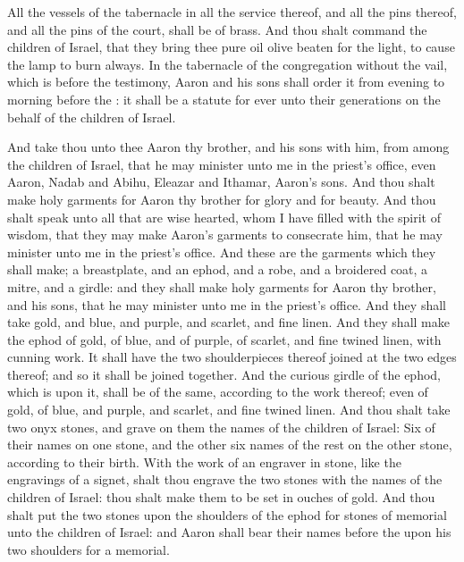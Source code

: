 \begin{biblechapter}
\verse All the vessels of the tabernacle in all the service thereof, and all the pins thereof, and all the pins of the court, shall be of brass.
 And thou shalt command the children of Israel, that they bring thee pure oil olive beaten for the light, to cause the lamp to burn always.
\verse In the tabernacle of the congregation without the vail, which is before the testimony, Aaron and his sons shall order it from evening to morning before the \LORD: it shall be a statute for ever unto their generations on the behalf of the children of Israel.
\end{biblechapter}

\begin{biblechapter} %
 And take thou unto thee Aaron thy brother, and his sons with him, from among the children of Israel, that he may minister unto me in the priest's office, even Aaron, Nadab and Abihu, Eleazar and Ithamar, Aaron's sons.
\verse And thou shalt make holy garments for Aaron thy brother for glory and for beauty.
\verse And thou shalt speak unto all that are wise hearted, whom I have filled with the spirit of wisdom, that they may make Aaron's garments to consecrate him, that he may minister unto me in the priest's office.
\verse And these are the garments which they shall make; a breastplate, and an ephod, and a robe, and a broidered coat, a mitre, and a girdle: and they shall make holy garments for Aaron thy brother, and his sons, that he may minister unto me in the priest's office.
\verse And they shall take gold, and blue, and purple, and scarlet, and fine linen.
 And they shall make the ephod of gold, of blue, and of purple, of scarlet, and fine twined linen, with cunning work.
\verse It shall have the two shoulderpieces thereof joined at the two edges thereof; and so it shall be joined together.
\verse And the curious girdle of the ephod, which is upon it, shall be of the same, according to the work thereof; even of gold, of blue, and purple, and scarlet, and fine twined linen.
\verse And thou shalt take two onyx stones, and grave on them the names of the children of Israel:
\verse Six of their names on one stone, and the other six names of the rest on the other stone, according to their birth.
\verse With the work of an engraver in stone, like the engravings of a signet, shalt thou engrave the two stones with the names of the children of Israel: thou shalt make them to be set in ouches of gold.
\verse And thou shalt put the two stones upon the shoulders of the ephod for stones of memorial unto the children of Israel: and Aaron shall bear their names before the \LORD upon his two shoulders for a memorial.

\end{biblechapter}
